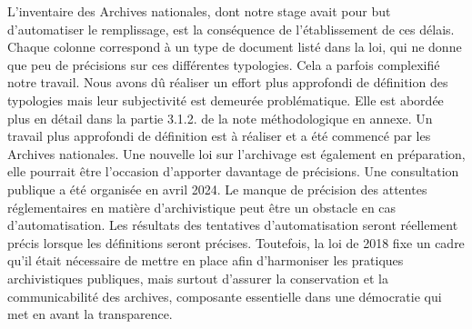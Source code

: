 L'inventaire des Archives nationales, dont notre stage avait pour but
d'automatiser le remplissage, est la conséquence de l'établissement de
ces délais. Chaque colonne correspond à un type de document listé dans la loi, qui ne donne que peu de précisions sur ces différentes typologies. Cela a parfois complexifié notre travail. Nous avons
dû réaliser un effort plus approfondi de définition des 
typologies mais leur subjectivité est demeurée problématique. Elle est abordée plus en détail dans la partie 3.1.2. de la note méthodologique en annexe. Un travail plus approfondi de définition
est à réaliser et a été commencé par les Archives nationales. Une
nouvelle loi sur l'archivage est également en préparation, elle pourrait
être l'occasion d'apporter davantage de précisions. Une consultation
publique a été organisée en avril 2024. Le manque de
précision des attentes réglementaires en matière d'archivistique peut
être un obstacle en cas d'automatisation. Les résultats des
tentatives d'automatisation seront réellement précis lorsque les
définitions seront précises. Toutefois, la loi de 2018 fixe un
cadre qu'il était nécessaire de mettre en place afin d'harmoniser les
pratiques archivistiques publiques, mais surtout d'assurer la
conservation et la communicabilité des archives, composante essentielle
dans une démocratie qui met en avant la transparence. 

